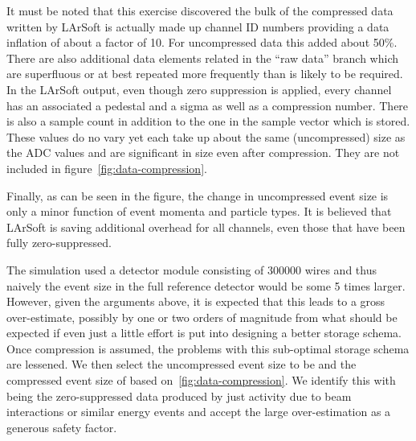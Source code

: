 It must be noted that this exercise discovered the bulk of the
compressed data written by LArSoft is actually made up channel ID
numbers providing a data inflation of about a factor of 10.
For uncompressed data this added about 50\%.
There are also additional data elements related in the ``raw data''
branch which are superfluous or at best repeated more frequently than
is likely to be required.
In the LArSoft output, even though zero suppression is applied, every
channel has an associated a pedestal and a sigma as well as a
compression number.
There is also a sample count in addition to the one in the sample
vector which is stored.
These values do no vary yet each take up about the same (uncompressed)
size as the ADC values and are significant in size even after
compression.
They are not included in figure~\ref{fig:data-compression}.

Finally, as can be seen in the figure, the change in uncompressed
event size is only a minor function of event momenta and particle types.
It is believed that LArSoft is saving additional overhead for all
channels, even those that have been fully zero-suppressed.

The simulation used a detector module consisting of \num{300000} wires and
thus naively the event size in the full reference detector would be some 5 times
larger.
However, given the arguments above, it is expected that this leads to
a gross over-estimate, possibly by one or two orders of magnitude from
what should be expected if even just a little effort is put into
designing a better storage schema.
Once compression is assumed, the problems with this sub-optimal
storage schema are lessened.
We then select the uncompressed event size to be \beameventsize and
the compressed event size of \beameventsizecompressed based
on~\ref{fig:data-compression}.
We identify this with being the zero-suppressed data produced by just
activity due to beam interactions or similar energy events and accept
the large over-estimation as a generous safety factor.






